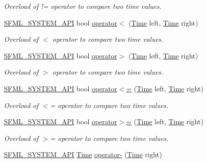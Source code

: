 \begin{DoxyCompactItemize}
\begin{DoxyCompactList}\small\item\em Overload of != operator to compare two time values. \end{DoxyCompactList}\item 
\hyperlink{_system_2_export_8hpp_a6476c9e422606477a4c23d92b1d79a1f}{S\-F\-M\-L\-\_\-\-S\-Y\-S\-T\-E\-M\-\_\-\-A\-P\-I} bool \hyperlink{classsf_1_1_time_ac222933174ddcff5d14c3ac7d1020d54}{operator$<$} (\hyperlink{classsf_1_1_time}{Time} left, \hyperlink{classsf_1_1_time}{Time} right)
\begin{DoxyCompactList}\small\item\em Overload of $<$ operator to compare two time values. \end{DoxyCompactList}\item 
\hyperlink{_system_2_export_8hpp_a6476c9e422606477a4c23d92b1d79a1f}{S\-F\-M\-L\-\_\-\-S\-Y\-S\-T\-E\-M\-\_\-\-A\-P\-I} bool \hyperlink{classsf_1_1_time_a23978402846bf3c7ac54a3f2c6b397a2}{operator$>$} (\hyperlink{classsf_1_1_time}{Time} left, \hyperlink{classsf_1_1_time}{Time} right)
\begin{DoxyCompactList}\small\item\em Overload of $>$ operator to compare two time values. \end{DoxyCompactList}\item 
\hyperlink{_system_2_export_8hpp_a6476c9e422606477a4c23d92b1d79a1f}{S\-F\-M\-L\-\_\-\-S\-Y\-S\-T\-E\-M\-\_\-\-A\-P\-I} bool \hyperlink{classsf_1_1_time_a2c22369869bf903578635bc6517c44d4}{operator$<$=} (\hyperlink{classsf_1_1_time}{Time} left, \hyperlink{classsf_1_1_time}{Time} right)
\begin{DoxyCompactList}\small\item\em Overload of $<$= operator to compare two time values. \end{DoxyCompactList}\item 
\hyperlink{_system_2_export_8hpp_a6476c9e422606477a4c23d92b1d79a1f}{S\-F\-M\-L\-\_\-\-S\-Y\-S\-T\-E\-M\-\_\-\-A\-P\-I} bool \hyperlink{classsf_1_1_time_ad69edc80cd01b7a03f5673b4276181eb}{operator$>$=} (\hyperlink{classsf_1_1_time}{Time} left, \hyperlink{classsf_1_1_time}{Time} right)
\begin{DoxyCompactList}\small\item\em Overload of $>$= operator to compare two time values. \end{DoxyCompactList}\item 
\hyperlink{_system_2_export_8hpp_a6476c9e422606477a4c23d92b1d79a1f}{S\-F\-M\-L\-\_\-\-S\-Y\-S\-T\-E\-M\-\_\-\-A\-P\-I} \hyperlink{classsf_1_1_time}{Time} \hyperlink{classsf_1_1_time_a1b23b91cf367764338c2ff922c65da4e}{operator-\/} (\hyperlink{classsf_1_1_time}{Time} right)

\end{DoxyCompactItemize}
